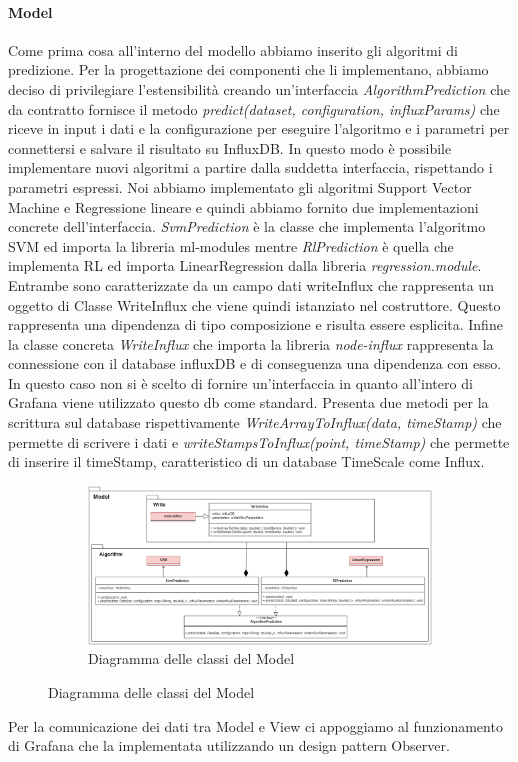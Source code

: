 			\paragraph{Model}
			Come prima cosa all'interno del modello abbiamo inserito gli algoritmi di predizione. Per la progettazione dei componenti che li implementano, abbiamo deciso di privilegiare l'estensibilità creando un'interfaccia \textit{AlgorithmPrediction} che da contratto fornisce il metodo \textit{predict(dataset, configuration, influxParams)} che riceve in input i dati e la configurazione per eseguire l'algoritmo e i parametri per connettersi e salvare il risultato su InfluxDB.
			In questo modo è possibile implementare nuovi algoritmi a partire dalla suddetta interfaccia, rispettando i parametri espressi. Noi abbiamo implementato gli algoritmi Support Vector Machine e Regressione lineare e quindi abbiamo fornito due implementazioni concrete dell'interfaccia.
			\textit{SvmPrediction} è la classe che implementa l'algoritmo SVM ed importa la libreria ml-modules mentre \textit{RlPrediction} è quella che implementa RL ed importa LinearRegression dalla libreria \textit{regression.module}. Entrambe sono caratterizzate da un campo dati writeInflux che rappresenta un oggetto di Classe WriteInflux che viene quindi istanziato nel costruttore. Questo rappresenta una dipendenza di tipo composizione e risulta essere esplicita. 
			Infine la classe concreta \textit{WriteInflux} che importa la libreria \textit{node-influx} rappresenta la connessione con il database influxDB e di conseguenza una dipendenza con esso. In questo caso non si è scelto di fornire un'interfaccia in quanto all'intero di Grafana viene utilizzato questo db come standard. Presenta due metodi per la scrittura sul database rispettivamente \textit{WriteArrayToInflux(data, timeStamp)} che permette di scrivere i dati e \textit{writeStampsToInflux(point, timeStamp)} che permette di inserire il timeStamp, caratteristico di un database TimeScale come Influx. 
			\mbox{}
			\begin{landscape}
				\begin{figure}
					\begin{figure} [H]
						\includegraphics[width=\linewidth]{./img/Diagrammi/d1.png}
						\caption{Diagramma delle classi del Model}
					\end{figure}
				\end{figure}
			\end{landscape}
			Per la comunicazione dei dati tra Model e View ci appoggiamo al funzionamento di Grafana che la implementata utilizzando un design pattern Observer. 
